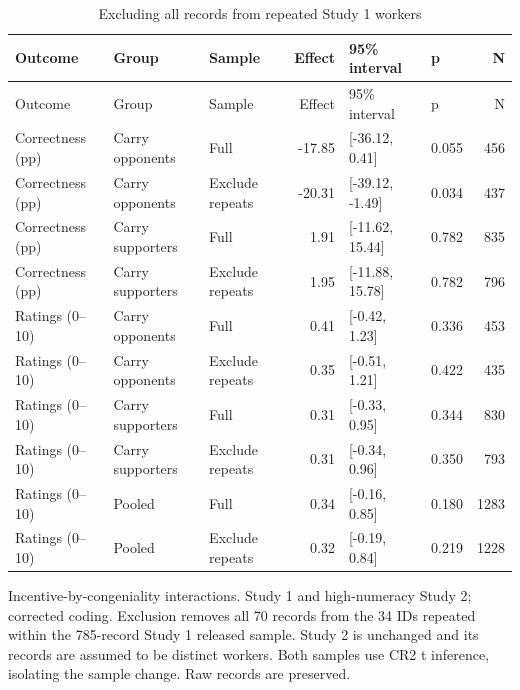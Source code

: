 
\begin{longtable}[t]{lllrllr}
\caption{\label{tab:worker_exclusion}Excluding all records from repeated Study 1 workers}\\
\toprule
Outcome & Group & Sample & Effect & 95\% interval & p & N\\
\midrule
\endfirsthead
\toprule
Outcome & Group & Sample & Effect & 95\% interval & p & N\\
\midrule
\endhead
Correctness (pp) & Carry opponents & Full & -17.85 & {}[-36.12, 0.41] & 0.055 & 456\\
Correctness (pp) & Carry opponents & Exclude repeats & -20.31 & {}[-39.12, -1.49] & 0.034 & 437\\
Correctness (pp) & Carry supporters & Full & 1.91 & {}[-11.62, 15.44] & 0.782 & 835\\
Correctness (pp) & Carry supporters & Exclude repeats & 1.95 & {}[-11.88, 15.78] & 0.782 & 796\\
Ratings (0--10) & Carry opponents & Full & 0.41 & {}[-0.42, 1.23] & 0.336 & 453\\
Ratings (0--10) & Carry opponents & Exclude repeats & 0.35 & {}[-0.51, 1.21] & 0.422 & 435\\
Ratings (0--10) & Carry supporters & Full & 0.31 & {}[-0.33, 0.95] & 0.344 & 830\\
Ratings (0--10) & Carry supporters & Exclude repeats & 0.31 & {}[-0.34, 0.96] & 0.350 & 793\\
Ratings (0--10) & Pooled & Full & 0.34 & {}[-0.16, 0.85] & 0.180 & 1283\\
Ratings (0--10) & Pooled & Exclude repeats & 0.32 & {}[-0.19, 0.84] & 0.219 & 1228\\
\bottomrule
\end{longtable}
\noindent\footnotesize Incentive-by-congeniality interactions. Study 1 and high-numeracy Study 2; corrected coding. Exclusion removes all 70 records from the 34 IDs repeated within the 785-record Study 1 released sample. Study 2 is unchanged and its records are assumed to be distinct workers. Both samples use CR2 t inference, isolating the sample change. Raw records are preserved.\par\normalsize
